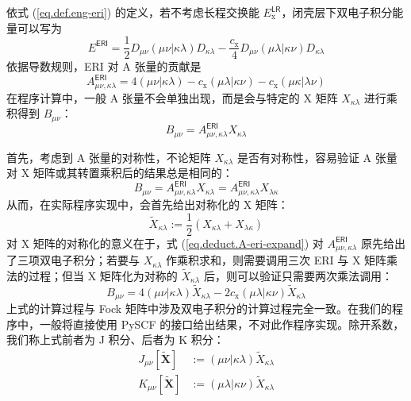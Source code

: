 依式 (\ref{eq.def.eng-eri}) 的定义，若不考虑长程交换能 $E_\mathrm{x}^\textsf{LR}$，闭壳层下双电子积分能量可以写为
\begin{equation*}
  E^\textsf{ERI} = \frac{1}{2} D_{\mu \nu} (\mu \nu | \kappa \lambda) D_{\kappa \lambda} - \frac{c_\mathrm{x}}{4} D_{\mu \nu} (\mu \lambda | \kappa \nu) D_{\kappa \lambda}
\end{equation*}
依据导数规则，ERI 对 A 张量的贡献是
\begin{equation}
  \label{eq.deduct.A-eri-expand}
  A_{\mu \nu, \kappa \lambda}^\textsf{ERI} = 4 (\mu \nu | \kappa \lambda) - c_\mathrm{x} (\mu \lambda | \kappa \nu) - c_\mathrm{x} (\mu \kappa | \lambda \nu)
\end{equation}
在程序计算中，一般 A 张量不会单独出现，而是会与特定的 X 矩阵 $X_{\kappa \lambda}$ 进行乘积得到 $B_{\mu \nu}$：
\begin{equation}
  B_{\mu \nu} = A_{\mu \nu, \kappa \lambda}^\textsf{ERI} X_{\kappa \lambda}
\end{equation}

首先，考虑到 A 张量的对称性，不论矩阵 $X_{\kappa \lambda}$ 是否有对称性，容易验证 A 张量对 X 矩阵或其转置乘积后的结果总是相同的：
\begin{equation*}
  B_{\mu \nu} = A_{\mu \nu, \kappa \lambda}^\textsf{ERI} X_{\kappa \lambda} = A_{\mu \nu, \kappa \lambda}^\textsf{ERI} X_{\lambda \kappa}
\end{equation*}
从而，在实际程序实现中，会首先给出对称化的 X 矩阵：
\begin{equation*}
  \tilde X_{\kappa \lambda} := \frac{1}{2} \left( X_{\kappa \lambda} + X_{\lambda \kappa} \right)
\end{equation*}
对 X 矩阵的对称化的意义在于，式 (\ref{eq.deduct.A-eri-expand}) 对 $A_{\mu \nu, \kappa \lambda}^\textsf{ERI}$ 原先给出了三项双电子积分；若要与 $X_{\kappa \lambda}$ 作乘积求和，则需要调用三次 ERI 与 X 矩阵乘法的过程；但当 X 矩阵化为对称的 $\tilde X_{\kappa \lambda}$ 后，则可以验证只需要两次乘法调用：
\begin{equation}
  \label{eq.A-contract-AO-JK}
  B_{\mu \nu} = 4 (\mu \nu | \kappa \lambda) \tilde X_{\kappa \lambda} - 2 c_\mathrm{x} (\mu \lambda | \kappa \nu) \tilde X_{\kappa \lambda}
\end{equation}
上式的计算过程与 Fock 矩阵中涉及双电子积分的计算过程完全一致。在我们的程序中，一般将直接使用 PySCF 的接口给出结果，不对此作程序实现。除开系数，我们称上式前者为 J 积分、后者为 K 积分：
\begin{align}
  \label{eq.def.J}
  J_{\mu \nu} [\tilde{\mathbf{X}}] &:= (\mu \nu | \kappa \lambda) \tilde X_{\kappa \lambda} \\
  \label{eq.def.K}
  K_{\mu \nu} [\tilde{\mathbf{X}}] &:= (\mu \lambda | \kappa \nu) \tilde X_{\kappa \lambda}
\end{align}

